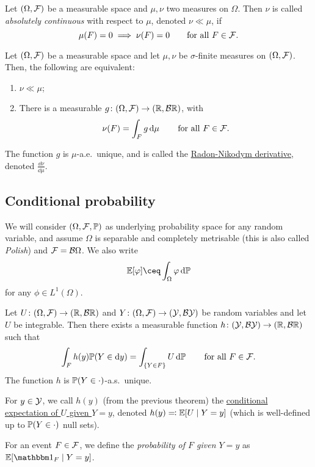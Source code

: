 \begin{definition}
	Let $(\Omega, \mathcal F)$ be a measurable space and $\mu, \nu$ two measures on $\Omega$. Then $\nu$ is called \emph{absolutely continuous} with respect to $\mu$, denoted $\nu \ll \mu$, if \[\mu(F) = 0 \implies \nu(F) =0 \qquad\text{for all $F \in \mathcal F$}. 
\]
\end{definition}

\begin{theorem}
	Let $(\Omega, \mathcal F)$ be a measurable space and let $\mu, \nu$ be $\sigma$-finite measures on $(\Omega, \mathcal F)$. Then, the following are equivalent:
	\begin{enumerate}
		\item $\nu \ll \mu$;
		\item There is a measurable $g \colon (\Omega, \mathcal F) \to (\mathbb R, \mathcal B\mathbb R)$, with
		\[
		\nu(F) = \int_F g \dd{\mu} \qquad\text{for all $F \in \mathcal F$}. 
		\]
	\end{enumerate}
The function $g$ is $\mu$-a.e.\ unique, and is called the \uline{Radon-Nikodym derivative}, denoted $\frac{\dd{\nu}}{\dd{\mu}}$. 
\end{theorem}

\subsection{Conditional probability}
We will consider $(\Omega, \mathcal F, \mathbb P)$ as underlying probability space for any random variable, and assume $\Omega$ is separable and completely metrisable (this is also called \emph{Polish}) and $\mathcal F = \mathcal B\Omega$. We also write
\[
\EE[\phi] \ceq \int_\Omega \phi \dd{\PP}
\]
for any $\phi \in L^1(\Omega)$. 

\begin{theorem}
	Let $U \colon (\Omega, \mathcal F) \to (\mathbb R, \mathcal B\mathbb R)$ and $Y \colon (\Omega, \mathcal F) \to (\mathcal Y, \mathcal B\mathcal Y)$ be random variables and let $U$ be integrable. Then there exists a measurable function $h \colon (\mathcal Y, \mathcal B\mathcal Y) \to(\mathbb R, \mathcal B\mathbb R)$ such that
	\[
	\int_F h(y) \mathbb P(Y \in \dd{y}) = \int_{\qty{Y\in F}} U \dd{\mathbb P} \qquad\text{for all $F \in \mathcal F$}. 
	\]
	The function $h$ is $\mathbb P(Y \in \cdot)$-a.s.\ unique.
\end{theorem}

\begin{definition}
	For $y \in \mathcal Y$, we call $h(y)$ (from the previous theorem) the \uline{conditional expectation of $U$ given $Y = y$}, denoted $h(y) \eqqcolon \mathbb E[U \mid Y = y]$ (which is well-defined up to $\mathbb P(Y \in \cdot)$ null sets). 
	
	For an event $F \in \mathcal F$, we define the \emph{probability of $F$ given $Y = y$} as $\EE[\ind_F \mid Y = y]$.
\end{definition}


